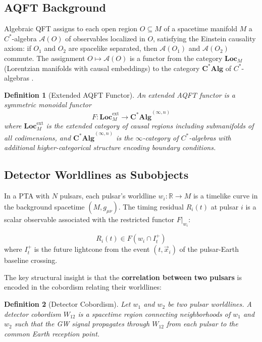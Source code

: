 \documentclass[11pt,a4paper]{article}
\newtheorem{definition}{Definition}[section]
\begin{document}
\subsection{AQFT Background}\label{sec:aqft}

Algebraic QFT assigns to each open region $O \subseteq M$ of a spacetime manifold $M$ a $C^*$-algebra $\mathcal{A}(O)$ of observables localized in $O$, satisfying the Einstein causality axiom: if $O_1$ and $O_2$ are spacelike separated, then $\mathcal{A}(O_1)$ and $\mathcal{A}(O_2)$ commute. The assignment $O \mapsto \mathcal{A}(O)$ is a functor from the category $\mathbf{Loc}_M$ (Lorentzian manifolds with causal embeddings) to the category $\mathbf{C^*Alg}$ of $C^*$-algebras \cite{Brunetti:2003,Moretti:2017}.

\begin{definition}[Extended AQFT Functor]
An extended AQFT functor is a symmetric monoidal functor
\begin{equation}
F: \mathbf{Loc}_{M}^{\mathrm{ext}} \to \mathbf{C^*Alg}^{(\infty, n)}
\end{equation}
where $\mathbf{Loc}_{M}^{\mathrm{ext}}$ is the extended category of causal regions including submanifolds of all codimensions, and $\mathbf{C^*Alg}^{(\infty, n)}$ is the $\infty$-category of $C^*$-algebras with additional higher-categorical structure encoding boundary conditions.
\end{definition}

\subsection{Detector Worldlines as Subobjects}\label{sec:detectors}

In a PTA with $N$ pulsars, each pulsar's worldline $w_i: \mathbb{R} \to M$ is a timelike curve in the background spacetime $(M, g_{\mu\nu})$. The timing residual $R_i(t)$ at pulsar $i$ is a scalar observable associated with the restricted functor $F|_{w_i}$:

\begin{equation}
R_i(t) \in F(w_i \cap I_t^+)
\end{equation}
where $I_t^+$ is the future lightcone from the event $(t, \vec{x}_i)$ of the pulsar-Earth baseline crossing.

The key structural insight is that the \textbf{correlation between two pulsars} is encoded in the cobordism relating their worldlines:

\begin{definition}[Detector Cobordism]
Let $w_1$ and $w_2$ be two pulsar worldlines. A detector cobordism $W_{12}$ is a spacetime region connecting neighborhoods of $w_1$ and $w_2$ such that the GW signal propagates through $W_{12}$ from each pulsar to the common Earth reception point.
\end{definition}
\end{document}

